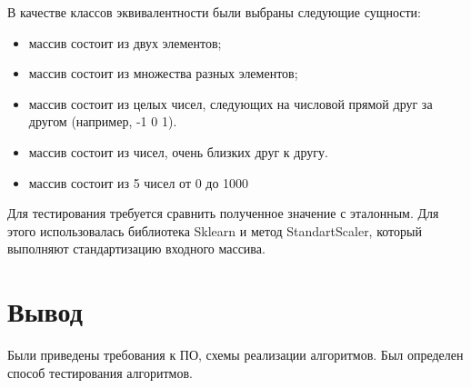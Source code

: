 В качестве классов эквивалентности были выбраны следующие сущности:
\begin{itemize}
	\item массив состоит из двух элементов;
	\item массив состоит из множества разных элементов;
	\item массив состоит из целых чисел, следующих на числовой прямой друг за другом (например, -1 0 1).
	\item массив состоит из чисел, очень близких друг к другу.
	\item массив состоит из 5 чисел от 0 до 1000
\end{itemize}

Для тестирования требуется сравнить полученное значение с эталонным.
Для этого использовалась библиотека Sklearn и метод StandartScaler, который
выполняют стандартизацию входного массива.

\section{Вывод}
Были приведены требования к ПО, схемы реализации алгоритмов.
Был определен способ тестирования алгоритмов.